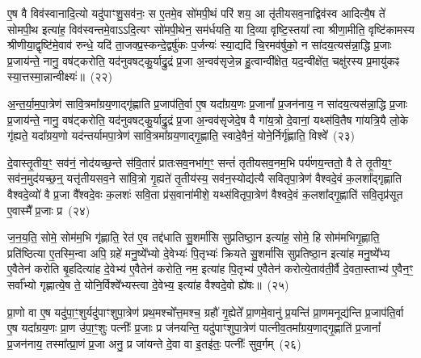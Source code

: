 ए॒ष वै विव॑स्वानादि॒त्यो यदु॑पाꣳशु॒सव॑नः॒ स ए॒तमे॒व सो॑मपी॒थं परि॑ शय॒ आ तृ॑तीय\-सव॒नाद्विव॑स्व आदित्यै॒ष ते॑ सोमपी॒थ इत्या॑ह॒ विव॑स्वन्तमे॒वा\-ऽऽ\-दि॒त्यꣳ सो॑मपी॒थेन॒ सम॑र्धयति॒ या दि॒व्या वृष्टि॒स्तया᳚ त्वा श्रीणा॒मीति॒ वृष्टि॑कामस्य श्रीणीया॒द्वृष्टि॑मे॒वाव॑ रुन्धे॒ यदि॑ ता॒जक्प्र॒स्कन्दे॒द्वर्\mbox{}षु॑कः प॒र्जन्यः॑ स्या॒द्यदि॑ चि॒रमव॑र्\mbox{}षुको॒ न सा॑दय॒त्यस॑न्ना॒द्धि प्र॒जाः प्र॒जाय॑न्ते॒ नानु॒ वष॑ट्करोति॒ यद॑नुवषट्कु॒र्याद्रु॒द्रं प्र॒जा अ॒न्वव॑सृजे॒न्न हु॒त्वान्वी᳚क्षेत॒ यद॒न्वीक्षे॑त॒ चक्षु॑रस्य प्र॒मायु॑कꣴ स्या॒त्तस्मा॒न्नान्वीक्ष्यः॑॥~(२२)\ip

{\anuvakamend[{ए॒व य॒ज्ञाज्ज॒रायु॒ तदे॒व तद॒न्तर्द॑धाति॒ न स॒प्तविꣳ॑शतिश्च}]}

अ॒न्त॒र्या॒म॒पा॒त्रेण॑ सावि॒त्रमा᳚ग्रय॒णाद्गृ॑ह्णाति प्र॒जा\-प॑ति॒र्वा ए॒ष यदा᳚ग्रय॒णः प्र॒जानां᳚ प्र॒जन॑नाय॒ न सा॑दय॒त्यस॑न्ना॒द्धि प्र॒जाः प्र॒जाय॑न्ते॒ नानु॒ वष॑ट्करोति॒ यद॑नुवषट्कु॒र्याद्रु॒द्रं प्र॒जा अ॒न्वव॑सृजेदे॒ष वै गा॑य॒त्रो दे॒वानां॒ यथ्स॑वि॒तैष गा॑यत्रि॒यै लो॒के गृ॑ह्यते॒ यदा᳚ग्रय॒णो यद॑न्तर्यामपा॒त्रेण॑ सावि॒त्रमा᳚ग्रय॒णाद्गृ॒ह्णाति॒ स्वादे॒वैनं॒ योने॒र्निर्गृ॑ह्णाति॒ विश्वे᳚~(२३)\ip

दे॒वास्तृ॒तीय॒ꣳ॒ सव॑नं॒ नोद॑यच्छ॒न्ते स॑वि॒तारं॑ प्रातःसव॒नभा॑ग॒ꣳ॒ सन्तं॑ तृतीय\-सव॒नम॒भि पर्य॑णय॒न्ततो॒ वै ते तृ॒तीय॒ꣳ॒ सव॑न॒मुद॑यच्छ॒न्॒ यत्तृ॑तीय\-सव॒ने सा॑वि॒त्रो गृ॒ह्यते॑ तृ॒तीय॑स्य॒ सव॑न॒स्योद्य॑त्यै सवितृपा॒त्रेण॑ वैश्वदे॒वं क॒लशा᳚द्गृह्णाति वैश्वदे॒व्यो॑ वै प्र॒जा वै᳚श्वदे॒वः क॒लशः॑ सवि॒ता प्र॑स॒वाना॑मीशे॒ यथ्स॑वितृपा॒त्रेण॑ वैश्वदे॒वं क॒लशा᳚द्गृ॒ह्णाति॑ सवि॒तृप्र॑सूत ए॒वास्मै᳚ प्र॒जाः प्र~(२४)\ip

ज॒न॒य॒ति॒ सोमे॒ सोम॑म॒भि गृ॑ह्णाति॒ रेत॑ ए॒व तद्द॑धाति सु॒शर्मा॑सि सुप्रतिष्ठा॒न इत्या॑ह॒ सोमे॒ हि सोम॑मभिगृ॒ह्णाति॒ प्रति॑ष्ठित्या ए॒तस्मि॒न्वा अपि॒ ग्रहे॑ मनु॒ष्ये᳚भ्यो दे॒वेभ्यः॑ पि॒तृभ्यः॑ क्रियते सु॒शर्मा॑सि सुप्रतिष्ठा॒न इत्या॑ह मनु॒ष्ये᳚भ्य ए॒वैतेन॑ करोति बृ॒हदित्या॑ह दे॒वेभ्य॑ ए॒वैतेन॑ करोति॒ नम॒ इत्या॑ह पि॒तृभ्य॑ ए॒वैतेन॑ करोत्ये॒ताव॑ती॒र्वै दे॒वता॒स्ताभ्य॑ ए॒वैन॒ꣳ॒ सर्वा᳚भ्यो गृह्णात्ये॒ष ते॒ योनि॒र्विश्वे᳚भ्यस्त्वा दे॒वेभ्य॒ इत्या॑ह वैश्वदे॒वो ह्ये॑षः॥~(२५)\ip

{\anuvakamend[{विश्वे॒ प्र पि॒तृभ्य॑ ए॒वैतेन॑ करो॒त्येका॒न्नविꣳ॑श॒तिश्च॑}]}

प्रा॒णो वा ए॒ष यदु॑पा॒ꣳ॒शुर्यदु॑पाꣳशुपा॒त्रेण॑ प्रथ॒मश्चो᳚त्त॒मश्च॒ ग्रहौ॑ गृ॒ह्येते᳚ प्रा॒णमे॒वानु॑ प्र॒यन्ति॑ प्रा॒णमनूद्य॑न्ति प्र॒जा\-प॑ति॒र्वा ए॒ष यदा᳚ग्रय॒णः प्रा॒ण उ॑पा॒ꣳ॒शुः पत्नीः᳚ प्र॒जाः प्र ज॑नयन्ति॒ यदु॑पाꣳशुपा॒त्रेण॑ पात्नीव॒तमा᳚ग्रय॒णाद्गृ॒ह्णाति॑ प्र॒जानां᳚ प्र॒जन॑नाय॒ तस्मा᳚त्प्रा॒णं प्र॒जा अनु॒ प्र जा॑यन्ते दे॒वा वा इ॒तइ॑तः॒ पत्नीः᳚ सुव॒र्गम्~(२६)\ip


